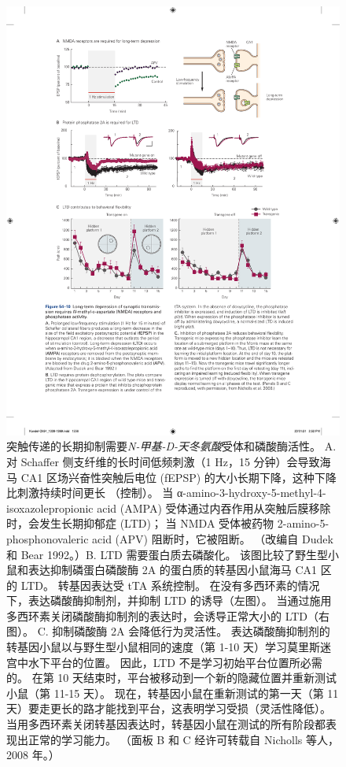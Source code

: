 \begin{figure}[htbp]
	\centering
	\includegraphics[width=0.95\linewidth]{chap54/fig_54_10}
	\caption{突触传递的长期抑制需要\textit{N-甲基-D-天冬氨酸}受体和磷酸酶活性。 A. 对 Schaffer 侧支纤维的长时间低频刺激（1 Hz，15 分钟）会导致海马 CA1 区场兴奋性突触后电位 (fEPSP) 的大小长期下降，这种下降比刺激持续时间更长 （控制）。 当 α-amino-3-hydroxy-5-methyl-4-isoxazolepropionic acid (AMPA) 受体通过内吞作用从突触后膜移除时，会发生长期抑郁症 (LTD)； 当 NMDA 受体被药物 2-amino-5-phosphonovaleric acid (APV) 阻断时，它被阻断。 （改编自 Dudek 和 Bear 1992。）B. LTD 需要蛋白质去磷酸化。 该图比较了野生型小鼠和表达抑制磷蛋白磷酸酶 2A 的蛋白质的转基因小鼠海马 CA1 区的 LTD。 转基因表达受 tTA 系统控制。 在没有多西环素的情况下，表达磷酸酶抑制剂，并抑制 LTD 的诱导（左图）。 当通过施用多西环素关闭磷酸酶抑制剂的表达时，会诱导正常大小的 LTD（右图）。 C. 抑制磷酸酶 2A 会降低行为灵活性。 表达磷酸酶抑制剂的转基因小鼠以与野生型小鼠相同的速度（第 1-10 天）学习莫里斯迷宫中水下平台的位置。 因此，LTD 不是学习初始平台位置所必需的。 在第 10 天结束时，平台被移动到一个新的隐藏位置并重新测试小鼠（第 11-15 天）。 现在，转基因小鼠在重新测试的第一天（第 11 天）要走更长的路才能找到平台，这表明学习受损（灵活性降低）。 当用多西环素关闭转基因表达时，转基因小鼠在测试的所有阶段都表现出正常的学习能力。 （面板 B 和 C 经许可转载自 Nicholls 等人，2008 年。）}
	\label{fig:54_10}
\end{figure}


